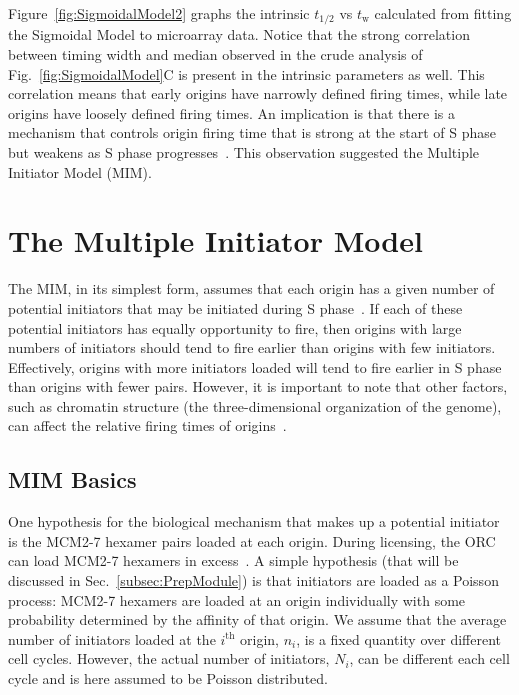 {	Figure~\ref{fig:SigmoidalModel2} graphs the intrinsic $t_{1/2}$ vs $t_{\text{w}}$ calculated from fitting the Sigmoidal Model to microarray data.
	Notice that the strong correlation between timing width and median observed in the crude analysis of Fig.~\ref{fig:SigmoidalModel}C is present in the intrinsic parameters as well.
	This correlation means that early origins have narrowly defined firing times, while late origins have loosely defined firing times.
	An implication is that there is a mechanism that controls origin firing time that is strong at the start of S phase but weakens as S phase progresses~\cite{ScottsThesis}.
	This observation suggested the Multiple Initiator Model (MIM).
	
	
	
	\section{The Multiple Initiator Model}
	\label{sec:MIM}
	
	The MIM, in its simplest form, assumes that each origin has a given number of potential initiators that may be initiated during S phase~\cite{ScottsThesis}.
	If each of these potential initiators has equally opportunity to fire, then origins with large numbers of initiators should tend to fire earlier than origins with few initiators.
	Effectively, origins with more initiators loaded will tend to fire earlier in S phase than origins with fewer pairs.
	However, it is important to note that other factors, such as chromatin structure (the three-dimensional organization of the genome), can affect the relative firing times of origins~\cite{Chromatin}.
	
		\subsection{MIM Basics}
		\label{subsec:MIMBasics}
		
		One hypothesis for the biological mechanism that makes up a potential initiator is the MCM2-7 hexamer pairs loaded at each origin.
		During licensing, the ORC can load MCM2-7 hexamers in excess~\cite{MultiMCM}.
		A simple hypothesis (that will be discussed in Sec.~\ref{subsec:PrepModule}) is that initiators are loaded as a Poisson process:
		MCM2-7 hexamers are loaded at an origin individually with some probability determined by the affinity of that origin.
		We assume that the average number of initiators loaded at the $i^{\text{th}}$ origin, $n_i$, is a fixed quantity over different cell cycles.
		However, the actual number of initiators, $N_i$, can be different each cell cycle and is here assumed to be Poisson distributed.
		
}
